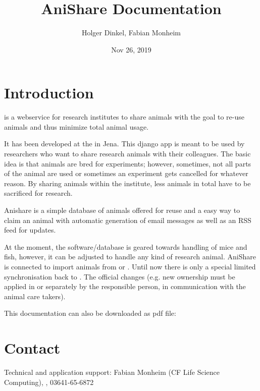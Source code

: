 \documentclass[letterpaper,10pt,openany,oneside,english]{sphinxmanual}
\title{AniShare Documentation}
\date{Nov 26, 2019}
\author{Holger Dinkel, Fabian Monheim}
\begin{document}
\pagestyle{empty}
\sphinxmaketitle
\pagestyle{plain}
\sphinxtableofcontents
\pagestyle{normal}
\label{\detokenize{index::doc}}



\chapter{Introduction}
\label{\detokenize{index:introduction}}
 is a webservice for research institutes to share animals with the goal to re-use
animals and thus minimize total animal usage.

It has been developed at the  in
Jena. This django app is meant to be used by researchers who want to share research animals with
their colleagues. The basic idea is that animals are bred for experiments; however, sometimes, not
all parts of the animal are used or sometimes an experiment gets cancelled for whatever reason. By
sharing animals within the institute, less animals in total have to be sacrificed for research.

Anishare is a simple database of animals offered for reuse and a easy way to claim an animal with
automatic generation of email messages as well as an RSS feed for updates.

\noindent{}

At the moment, the software/database is geared towards handling of mice and fish, however, it can be adjusted
to handle any kind of research animal. AniShare is connected to import animals from  or . Until now there is only a special limited synchronisation back to .
The official changes (e.g. new ownership must be applied in  or  separately by the responsible person, in communication with the animal care takers).

This documentation can also be downloaded as pdf file: 


\chapter{Contact}
\label{\detokenize{index:contact}}
Technical and application support: Fabian Monheim (CF Life Science Computing), , 03641-65-6872
\end{document}
